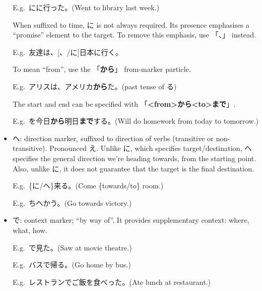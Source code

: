\documentclass[../nihongo-gakushuu-kyouzai.tex]{subfiles}
\begin{document}
\begin{itemize}
    E.g.\ にに行った。(Went to library last week.)

    When suffixed to time, に is not always required. Its presence emphasises a ``promise'' element to the target. To remove this emphasis, use 「、」 instead.

    E.g.\ 友達は、[、/に]日本に行く。

    To mean ``from'', use the 「\textbf{から}」 from-marker particle.

    E.g.\ アリスは、アメリカ\textbf{から}た。(past tense of る)

    The start and end can be specified with 「\textbf{<from>から<to>まで}」.

    E.g.\ を今日\textbf{から}明日\textbf{まで}する。(Will do homework from today to tomorrow.)

    \item へ: direction marker, suffixed to direction of verbs (transitive or non-transitive). Pronounced え. Unlike に, which specifies target/destination, へ specifies the general direction we're heading towards, from the starting point. Also, unlike に, it does not guarantee that the target is the final destination. 

    E.g.\ \{に/へ\}来る。(Come \{towards/to\} room.)

    E.g.\ ちへかう。(Go towards victory.)
    \item で: context marker; ``by way of''. It provides supplementary context: where, what, how.

    E.g.\ で見た。(Saw at movie theatre.)

    E.g.\ バスで帰る。(Go home by bus.)

    E.g.\ レストランでご飯を食べった。(Ate lunch at restaurant.)
\end{itemize}
\end{document}
